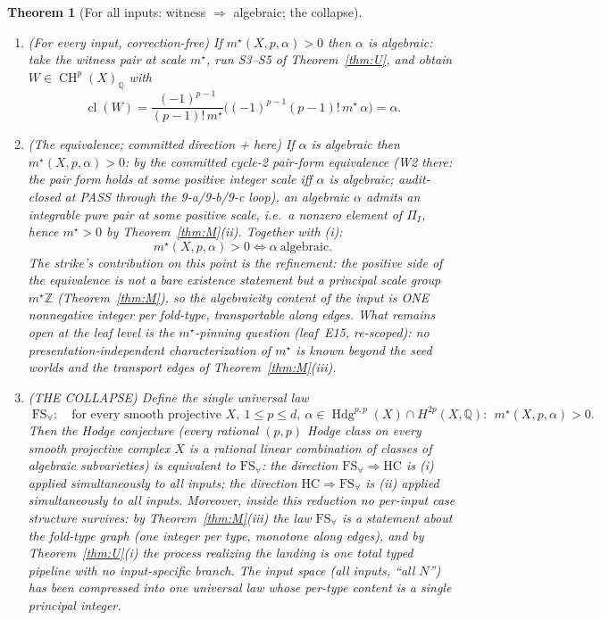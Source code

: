\documentclass[11pt]{article}
\newtheorem{theorem}{Theorem}[section]
\newcommand{\cl}{\operatorname{cl}}
\newcommand{\CH}{\operatorname{CH}}
\newcommand{\Hdg}{\operatorname{Hdg}}
\newcommand{\Z}{\mathbb{Z}}
\newcommand{\Q}{\mathbb{Q}}
\newcommand{\FS}{\mathrm{FS}_\forall}
\begin{document}
\begin{theorem}[For all inputs: witness $\Rightarrow$ algebraic;
the collapse]
\label{thm:N}
\begin{enumerate}
\item[\textup{(i)}] \emph{(For every input, correction-free)} If
$m^\star(X,p,\alpha)>0$ then $\alpha$ is algebraic: take the witness pair at
scale $m^\star$, run S3--S5 of Theorem~\ref{thm:U}, and obtain
$W\in\CH^p(X)_\Q$ with
\[
\cl(W)=\frac{(-1)^{p-1}}{(p-1)!\,m^\star}
\bigl((-1)^{p-1}(p-1)!\,m^\star\,\alpha\bigr)=\alpha .
\]
\item[\textup{(ii)}] \emph{(The equivalence; committed direction + here)}
If $\alpha$ is algebraic then $m^\star(X,p,\alpha)>0$: by the committed
cycle-2 pair-form equivalence (W2 there: the pair form holds at some positive
integer scale iff $\alpha$ is algebraic; audit-closed at PASS through the
9-a/9-b/9-c loop), an algebraic $\alpha$ admits an integrable pure pair at
some positive scale, i.e.\ a nonzero element of $\Pi_I$, hence
$m^\star>0$ by Theorem~\ref{thm:M}(ii).  Together with (i):
\[
\boxed{\;m^\star(X,p,\alpha)>0\iff \alpha\ \text{algebraic}.\;}
\]
The strike's contribution on this point is the \emph{refinement}: the
positive side of the equivalence is not a bare existence statement but a
principal scale group $m^\star\Z$ (Theorem~\ref{thm:M}), so the algebraicity
content of the input is ONE nonnegative integer per fold-type, transportable
along edges.  What remains open at the leaf level is the
\emph{$m^\star$-pinning question} (leaf~E15, re-scoped): no
presentation-independent characterization of $m^\star$ is known beyond the
seed worlds and the transport edges of Theorem~\ref{thm:M}(iii).
\item[\textup{(iii)}] \emph{(THE COLLAPSE)} Define the single universal law
\[
\boxed{\;\FS:\quad
\text{for every smooth projective } X,\ 1\le p\le d,\
\alpha\in\Hdg^{p,p}(X)\cap H^{2p}(X,\Q):\ \
m^\star(X,p,\alpha)>0 .\;}
\]
Then the Hodge conjecture (every rational $(p,p)$ Hodge class on every
smooth projective complex $X$ is a rational linear combination of classes of
algebraic subvarieties) is \emph{equivalent} to $\FS$: the direction
$\FS\Rightarrow\mathrm{HC}$ is (i) applied simultaneously to all inputs; the
direction $\mathrm{HC}\Rightarrow\FS$ is (ii) applied simultaneously to all
inputs.  Moreover, inside this reduction no per-input case structure survives:
by Theorem~\ref{thm:M}(iii) the law $\FS$ is a statement about the fold-type
graph (one integer per type, monotone along edges), and by
Theorem~\ref{thm:U}(i) the process realizing the landing is one total typed
pipeline with no input-specific branch.  The input space (all inputs, ``all
$N$'') has been compressed into one universal law whose per-type content is a
single principal integer.
\end{enumerate}
\end{theorem}
\end{document}

